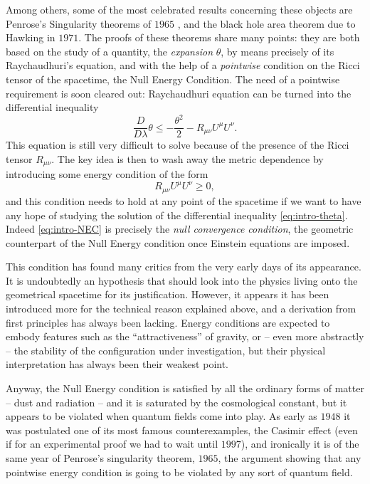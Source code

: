 Among others, some of the most celebrated results concerning these objects are Penrose's Singularity theorems of \(1965\) \cite[]{penrose1965gravitational}, and the black hole area theorem due to Hawking \cite[]{hawking1972black} in \(1971\). The proofs of these theorems share many points: they are both based on the study of a quantity, the \emph{expansion} \(\theta\), by means precisely of its Raychaudhuri's equation, and with the help of a \emph{pointwise} condition on the Ricci tensor of the spacetime, the Null Energy Condition. The need of a pointwise requirement is soon cleared out: Raychaudhuri equation can be turned into the differential inequality
\begin{equation}
    \label{eq:intro-theta}
    \frac{D}{D\lambda}\theta \le -\frac{\theta^2}{2} - R_{\mu\nu}U^{\mu}U^{\nu}.
\end{equation}
This equation is still very difficult to solve because of the presence of the Ricci tensor \(R_{\mu\nu}\). The key idea is then to wash away the metric dependence by introducing some energy condition of the form 
\begin{equation}
    \label{eq:intro-NEC}
    R_{\mu\nu}U^{\mu}U^{\nu}\ge 0,
\end{equation}
and this condition needs to hold at any point of the spacetime if we want to have any hope of studying the solution of the differential inequality \eqref{eq:intro-theta}. Indeed \eqref{eq:intro-NEC} is precisely the \emph{null convergence condition}, the geometric counterpart of the Null Energy condition once Einstein equations are imposed.

This condition has found many critics from the very early days of its appearance. It is undoubtedly an hypothesis that should look into the physics living onto the geometrical spacetime for its justification. However, it appears it has been introduced more for the technical reason explained above, and a derivation from first principles has always been lacking. Energy conditions are expected to embody features such as the ``attractiveness'' of gravity, or -- even more abstractly -- the stability of the configuration under investigation, but their physical interpretation has always been their weakest point.

Anyway, the Null Energy condition is satisfied by all the ordinary forms of matter -- dust and radiation -- and it is saturated by the cosmological constant, but it appears to be violated when quantum fields come into play.
As early as \(1948\) it was postulated one of its most famous counterexamples, the Casimir effect (even if for an experimental proof we had to wait until \(1997\)), and ironically it is of the same year of Penrose's singularity theorem, \(1965\), the argument showing that any pointwise energy condition is going to be violated by any sort of quantum field.

